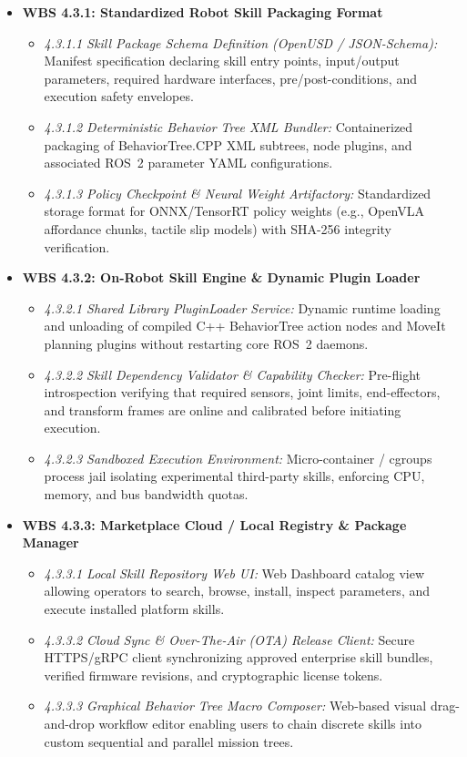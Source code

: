 \documentclass[10pt,a4paper]{article}
\begin{document}
\begin{itemize}[leftmargin=1.5em]
    \item \textbf{WBS 4.3.1: Standardized Robot Skill Packaging Format}
    \begin{itemize}[leftmargin=1.2em]
        \item \emph{4.3.1.1 Skill Package Schema Definition (OpenUSD / JSON-Schema):} Manifest specification declaring skill entry points, input/output parameters, required hardware interfaces, pre/post-conditions, and execution safety envelopes.
        \item \emph{4.3.1.2 Deterministic Behavior Tree XML Bundler:} Containerized packaging of BehaviorTree.CPP XML subtrees, node plugins, and associated ROS~2 parameter YAML configurations.
        \item \emph{4.3.1.3 Policy Checkpoint \& Neural Weight Artifactory:} Standardized storage format for ONNX/TensorRT policy weights (e.g., OpenVLA affordance chunks, tactile slip models) with SHA-256 integrity verification.
    \end{itemize}

    \item \textbf{WBS 4.3.2: On-Robot Skill Engine \& Dynamic Plugin Loader}
    \begin{itemize}[leftmargin=1.2em]
        \item \emph{4.3.2.1 Shared Library PluginLoader Service:} Dynamic runtime loading and unloading of compiled C++ BehaviorTree action nodes and MoveIt planning plugins without restarting core ROS~2 daemons.
        \item \emph{4.3.2.2 Skill Dependency Validator \& Capability Checker:} Pre-flight introspection verifying that required sensors, joint limits, end-effectors, and transform frames are online and calibrated before initiating execution.
        \item \emph{4.3.2.3 Sandboxed Execution Environment:} Micro-container / cgroups process jail isolating experimental third-party skills, enforcing CPU, memory, and bus bandwidth quotas.
    \end{itemize}

    \item \textbf{WBS 4.3.3: Marketplace Cloud / Local Registry \& Package Manager}
    \begin{itemize}[leftmargin=1.2em]
        \item \emph{4.3.3.1 Local Skill Repository Web UI:} Web Dashboard catalog view allowing operators to search, browse, install, inspect parameters, and execute installed platform skills.
        \item \emph{4.3.3.2 Cloud Sync \& Over-The-Air (OTA) Release Client:} Secure HTTPS/gRPC client synchronizing approved enterprise skill bundles, verified firmware revisions, and cryptographic license tokens.
        \item \emph{4.3.3.3 Graphical Behavior Tree Macro Composer:} Web-based visual drag-and-drop workflow editor enabling users to chain discrete skills into custom sequential and parallel mission trees.
    \end{itemize}
\end{itemize}
\end{document}

